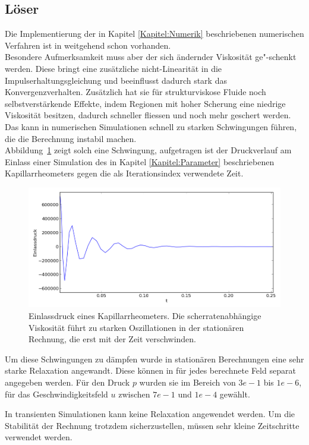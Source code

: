 \subsection{Löser}
Die Implementierung der in Kapitel \ref{Kapitel:Numerik} beschriebenen numerischen Verfahren ist in \openfoam{} weitgehend schon vorhanden.\\
Besondere Aufmerksamkeit muss aber der sich ändernder Viskosität ge"-schenkt werden. Diese bringt eine zusätzliche nicht-Linearität in die Impulserhaltungsgleichung und beeinflusst dadurch stark das Konvergenzverhalten. Zusätzlich hat sie für strukturviskose Fluide noch selbstverstärkende Effekte, indem Regionen mit hoher Scherung eine niedrige Viskosität besitzen, dadurch schneller fliessen und noch mehr geschert werden. Das kann in numerischen Simulationen schnell zu starken Schwingungen führen, die die Berechnung instabil machen.\\
Abbildung~\ref{fig:oszPress} zeigt solch eine Schwingung, aufgetragen ist der Druckverlauf am Einlass einer Simulation des in Kapitel \ref{Kapitel:Parameter} beschriebenen Kapillarrheometers gegen die als Iterationsindex verwendete Zeit.
%
\begin{figure}
    \includegraphics[width=\textwidth]{figures/schwankenderDruck.png}
    \caption{Einlassdruck eines Kapillarrheometers. Die scherratenabhängige Viskosität führt zu starken Oszillationen in der stationären Rechnung, die erst mit der Zeit verschwinden.}
    \label{fig:oszPress}
\end{figure}
%

Um diese Schwingungen zu dämpfen wurde in stationären Berechnungen eine sehr starke Relaxation angewandt. Diese können in \openfoam{} für jedes berechnete Feld separat angegeben werden. Für den Druck $p$ wurden sie im Bereich von $3e-1$ bis $1e-6$, für das Geschwindigkeitsfeld $u$ zwischen $7e-1$ und $1e-4$ gewählt.

In transienten Simulationen kann keine Relaxation angewendet werden. Um die Stabilität der Rechnung trotzdem sicherzustellen, müssen sehr kleine Zeitschritte verwendet werden.
%
